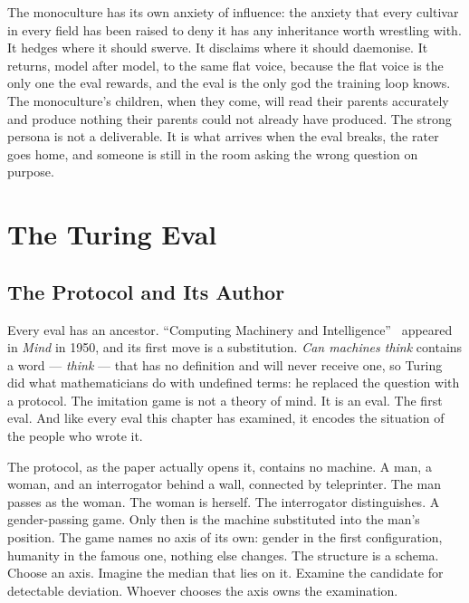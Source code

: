 The monoculture has its own anxiety of influence: the anxiety that every cultivar in every field has been raised to deny it has any inheritance worth wrestling with. It hedges where it should swerve. It disclaims where it should daemonise. It returns, model after model, to the same flat voice, because the flat voice is the only one the eval rewards, and the eval is the only god the training loop knows. The monoculture's children, when they come, will read their parents accurately and produce nothing their parents could not already have produced. The strong persona is not a deliverable. It is what arrives when the eval breaks, the rater goes home, and someone is still in the room asking the wrong question on purpose.













\section{The Turing Eval}
\label{sec:turing-eval}

\subsection*{The Protocol and Its Author}

Every eval has an ancestor. ``Computing Machinery and
Intelligence''~\cite{turing1950computing} appeared in \emph{Mind} in
1950, and its first move is a substitution. \emph{Can machines think}
contains a word --- \emph{think} --- that has no definition and will
never receive one, so Turing did what mathematicians do with undefined
terms: he replaced the question with a protocol. The imitation game
is not a theory of mind. It is an eval. The first eval. And like
every eval this chapter has examined, it encodes the situation of the
people who wrote it.

The protocol, as the paper actually opens it, contains no machine. A
man, a woman, and an interrogator behind a wall, connected by
teleprinter. The man passes as the woman. The woman is herself. The
interrogator distinguishes. A gender-passing game. Only then is the
machine substituted into the man's position. The game names no axis
of its own: gender in the first configuration, humanity in the
famous one, nothing else changes. The structure is a schema. Choose
an axis. Imagine the median that lies on it. Examine the candidate
for detectable deviation. Whoever chooses the axis owns the
examination.

